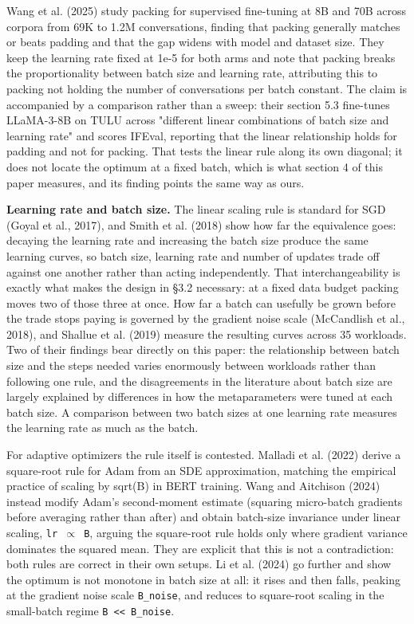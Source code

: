 \documentclass[11pt]{article}
\begin{document}
Wang et al. (2025) study packing for supervised fine-tuning at 8B and 70B across corpora from 69K to 1.2M conversations, finding that packing generally matches or beats padding and that the gap widens with model and dataset size. They keep the learning rate fixed at 1e-5 for both arms and note that packing breaks the proportionality between batch size and learning rate, attributing this to packing not holding the number of conversations per batch constant. The claim is accompanied by a comparison rather than a sweep: their section 5.3 fine-tunes LLaMA-3-8B on TULU across "different linear combinations of batch size and learning rate" and scores IFEval, reporting that the linear relationship holds for padding and not for packing. That tests the linear rule along its own diagonal; it does not locate the optimum at a fixed batch, which is what section 4 of this paper measures, and its finding points the same way as ours.

\textbf{Learning rate and batch size.} The linear scaling rule is standard for SGD (Goyal et al., 2017), and Smith et al. (2018) show how far the equivalence goes: decaying the learning rate and increasing the batch size produce the same learning curves, so batch size, learning rate and number of updates trade off against one another rather than acting independently. That interchangeability is exactly what makes the design in \S{}3.2 necessary: at a fixed data budget packing moves two of those three at once. How far a batch can usefully be grown before the trade stops paying is governed by the gradient noise scale (McCandlish et al., 2018), and Shallue et al. (2019) measure the resulting curves across 35 workloads. Two of their findings bear directly on this paper: the relationship between batch size and the steps needed varies enormously between workloads rather than following one rule, and the disagreements in the literature about batch size are largely explained by differences in how the metaparameters were tuned at each batch size. A comparison between two batch sizes at one learning rate measures the learning rate as much as the batch.

For adaptive optimizers the rule itself is contested. Malladi et al. (2022) derive a square-root rule for Adam from an SDE approximation, matching the empirical practice of scaling by sqrt(B) in BERT training. Wang and Aitchison (2024) instead modify Adam's second-moment estimate (squaring micro-batch gradients before averaging rather than after) and obtain batch-size invariance under linear scaling, \texttt{lr $\propto$ B}, arguing the square-root rule holds only where gradient variance dominates the squared mean. They are explicit that this is not a contradiction: both rules are correct in their own setups. Li et al. (2024) go further and show the optimum is not monotone in batch size at all: it rises and then falls, peaking at the gradient noise scale \texttt{B\_\allowbreak{}noise}, and reduces to square-root scaling in the small-batch regime \texttt{B \textless{}\textless{} B\_\allowbreak{}noise}.
\end{document}
